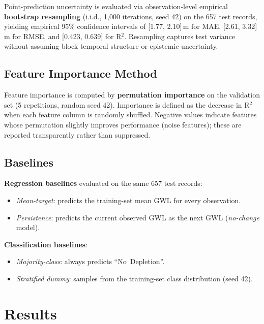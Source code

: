 \documentclass[conference]{IEEEtran}
\begin{document}
Point-prediction uncertainty is evaluated via observation-level
empirical \textbf{bootstrap resampling} (i.i.d., 1,000 iterations, seed 42)
on the 657 test records, yielding empirical 95\% confidence
intervals of [1.77, 2.10]\,m for MAE, [2.61, 3.32]\,m for RMSE, and
[0.423, 0.639] for R$^2$. Resampling captures test variance without
assuming block temporal structure or epistemic uncertainty.

\subsection{Feature Importance Method}

Feature importance is computed by \textbf{permutation importance}
on the validation set (5 repetitions, random seed 42).
Importance is defined as the decrease in R$^2$ when each feature
column is randomly shuffled.
Negative values indicate features whose permutation slightly
improves performance (noise features); these are reported
transparently rather than suppressed.

\subsection{Baselines}

\textbf{Regression baselines} evaluated on the same 657 test records:
\begin{itemize}\setlength{\itemsep}{1pt}\setlength{\parskip}{0pt}
  \item \textit{Mean-target}: predicts the training-set mean GWL
        for every observation.
  \item \textit{Persistence}: predicts the current observed GWL
        as the next GWL (\emph{no-change} model).
\end{itemize}

\textbf{Classification baselines}:
\begin{itemize}\setlength{\itemsep}{1pt}\setlength{\parskip}{0pt}
  \item \textit{Majority-class}: always predicts ``No~Depletion''.
  \item \textit{Stratified dummy}: samples from the training-set
        class distribution (seed 42).
\end{itemize}

\section{Results}
\label{sec:results}
\end{document}
